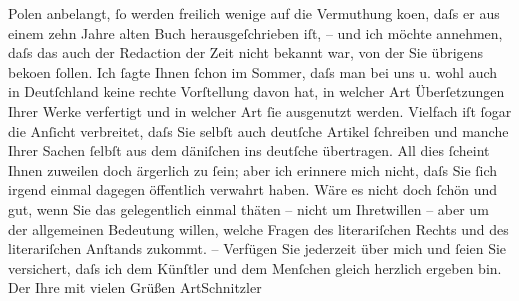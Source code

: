 \begin{ledgroupsized}[t]{13cm}
                     Polen anbelangt, ſo werden freilich wenige auf die Vermuthung ko{\geminationm}en, daſs er aus einem {\pb}zehn Jahre alten Buch herausgeſchrieben iſt, – und
               ich möchte annehmen, daſs das auch der Redaction der Zeit nicht bekannt war, von der Sie übrigens \label{K_L00602-1v}\label{K_L00602-1h} beko{\geminationm}en
               ſollen. Ich ſagte Ihnen ſchon im Sommer, daſs man bei uns u. wohl auch in Deutſchland keine rechte Vorſtellung davon hat, in
               welcher Art Überſetzungen Ihrer Werke verfertigt und in welcher Art ſie ausgenutzt
               werden. Vielfach iſt ſogar die Anſicht verbreitet, daſs Sie selbſt auch deutſche
               Artikel ſchreiben und manche Ihrer Sachen ſelbſt aus dem däniſchen ins deutſche übertragen.\pend
           \pstart
           {\pb}All dies ſcheint Ihnen zuweilen doch ärgerlich zu
               ſein; aber ich erinnere mich nicht, daſs Sie ſich irgend einmal dagegen öffentlich
               verwahrt haben.\pend
           \pstart
           Wäre es nicht doch ſchön und gut, wenn Sie das gelegentlich einmal thäten – nicht um
               Ihretwillen – aber um der allgemeinen Bedeutung willen, welche Fragen des
               literariſchen Rechts und des literariſchen Anſtands zukommt. –\pend
           \pstart
           Verfügen Sie jederzeit über mich und ſeien Sie versichert, daſs ich dem Künſtler und
               dem Menſchen gleich herzlich ergeben bin.\pend
           \pstart Der Ihre mit vielen Grüßen \spacefill\mbox{ArtSchnitzler}\pend{}
         
         \endnumbering{}\end{ledgroupsized}  \newcommand{\dateiname}{L00602}\newcommand{\titel}{Arthur Schnitzler an Georg Brandes, 8. 10. 1896}\newcommand{\editorInnen}{Martin Anton Müller und Gerd-Hermann Susen}
      